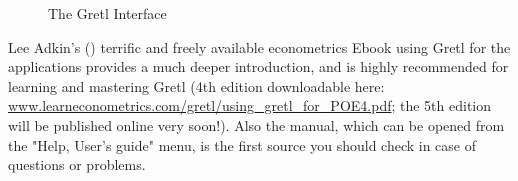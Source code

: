 \documentclass[11pt]{article}
\begin{document}
\begin{figure}[h!]
	\centering
	
	
	\caption{The Gretl Interface}
	\label{fig:GUI}
\end{figure}


Lee Adkin's (\citeyear{Adkins2014}) terrific and freely available econometrics Ebook using Gretl for the applications provides a much deeper introduction, and is highly recommended for learning and mastering Gretl (4th edition downloadable here: \\ \url{www.learneconometrics.com/gretl/using_gretl_for_POE4.pdf}; the 5th edition will be published online very soon!). Also the manual, which can be opened from the "Help, User's guide" menu, is the first source you should check in case of questions or problems.
\end{document}
